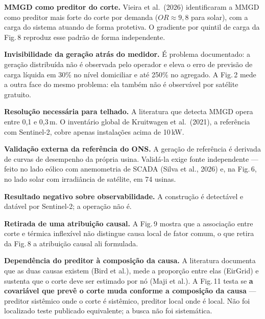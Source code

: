 \documentclass[10pt]{article}
\newcommand{\bloco}[1]{\vspace{2pt}{\color{vermelho}\footnotesize\textbf{#1}}\par\vspace{-2pt}}
\begin{document}
\begin{minipage}[t]{0.315\linewidth}\vspace{0pt}\footnotesize
\bloco{Resultados reproduzidos}
\textbf{MMGD como preditor do corte.} Vieira et al.\ (2026) identificaram a MMGD como
preditor mais forte do corte por demanda ($OR\approx9{,}8$ para solar), com a carga do
sistema atuando de forma protetiva. O gradiente por quintil de carga da Fig.\,8 reproduz
esse padrão de forma independente.

\textbf{Invisibilidade da geração atrás do medidor.} É problema documentado: a geração
distribuída não é observada pelo operador e eleva o erro de previsão de carga líquida em
30\% no nível domiciliar e até 250\% no agregado. A Fig.\,2 mede a outra face do mesmo
problema: ela também não é observável por satélite gratuito.

\textbf{Resolução necessária para telhado.} A literatura que detecta MMGD opera entre 0,1
e 0,3\,m. O inventário global de Kruitwagen et al.\ (2021), a referência com Sentinel-2,
cobre apenas instalações acima de 10\,kW.

\bloco{Acréscimos}
\textbf{Validação externa da referência do ONS.} A geração de referência é derivada de
curvas de desempenho da própria usina. Validá-la exige fonte independente --- feito no
lado eólico com anemometria de SCADA (Silva et al., 2026) e, na Fig.\,6, no lado solar
com irradiância de satélite, em 74 usinas.

\textbf{Resultado negativo sobre observabilidade.} A construção é detectável e datável
por Sentinel-2; a operação não é.

\textbf{Retirada de uma atribuição causal.} A Fig.\,9 mostra que a associação entre corte
e térmica inflexível não distingue causa local de fator comum, o que retira da Fig.\,8 a
atribuição causal ali formulada.

\textbf{Dependência do preditor à composição da causa.} A literatura documenta que as
duas causas existem (Bird et al.), mede a proporção entre elas (EirGrid) e sustenta que o
corte deve ser estimado por nó (Maji et al.). A Fig.\,11 testa se \textbf{a covariável que
prevê o corte muda conforme a composição da causa} --- preditor sistêmico onde o corte é
sistêmico, preditor local onde é local. Não foi localizado teste publicado equivalente; a
busca não foi sistemática.
\end{minipage}\hfill
\end{document}
